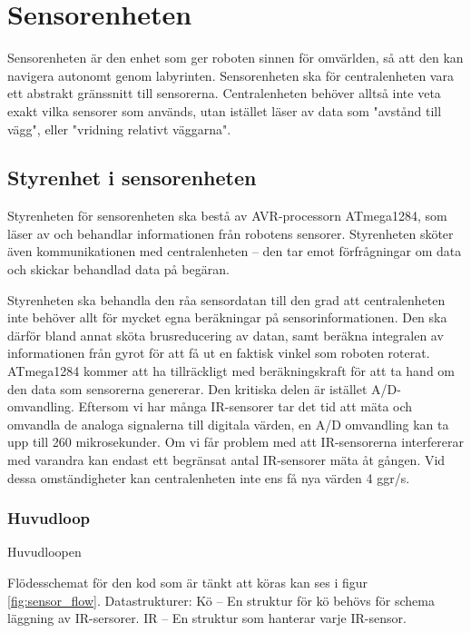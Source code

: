 \documentclass[a4paper,titlepage,12pt]{article}
\begin{document}
    \newpage

	\section{Sensorenheten}
	
	Sensorenheten är den enhet som ger roboten sinnen för omvärlden, så att den
	kan navigera autonomt genom labyrinten. Sensorenheten ska för
	centralenheten vara ett abstrakt gränssnitt till sensorerna. Centralenheten
	behöver alltså inte veta exakt vilka sensorer som används, utan istället
	läser av data som "avstånd till vägg", eller "vridning relativt väggarna".

	\subsection{Styrenhet i sensorenheten}

	Styrenheten för sensorenheten ska bestå av AVR-processorn ATmega1284, som läser av och 
	behandlar informationen från robotens sensorer. Styrenheten sköter även
	kommunikationen med centralenheten -- den tar emot förfrågningar om data och
	skickar behandlad data på begäran.

	Styrenheten ska behandla den råa sensordatan till den grad att
	centralenheten inte behöver allt för mycket egna beräkningar på
	sensorinformationen. Den ska därför bland annat sköta brusreducering av
	datan, samt beräkna integralen av informationen från gyrot för att få ut en
	faktisk vinkel som roboten roterat. ATmega1284 kommer att ha tillräckligt med 
	beräkningskraft för att ta hand om den data som sensorerna genererar. Den kritiska 
	delen är istället A/D-omvandling. Eftersom vi har många IR-sensorer tar det tid att 
	mäta och omvandla de analoga signalerna till digitala värden, en A/D omvandling kan ta 
	upp till 260 mikrosekunder. Om vi får problem med att IR-sensorerna interfererar med 
	varandra kan endast ett begränsat antal IR-sensorer mäta åt gången. Vid
    dessa omständigheter kan 
	centralenheten inte ens få nya värden 4 ggr/s. %

    \subsubsection{Huvudloop}
    Huvudloopen 

    Flödesschemat för den kod som är tänkt att köras kan ses i figur
    \ref{fig:sensor_flow}. 
	Datastrukturer:
	Kö -- En struktur för kö behövs för schema läggning av IR-sersorer. 
	IR -- En struktur som hanterar varje IR-sensor. 
    \newpage
\end{document}
